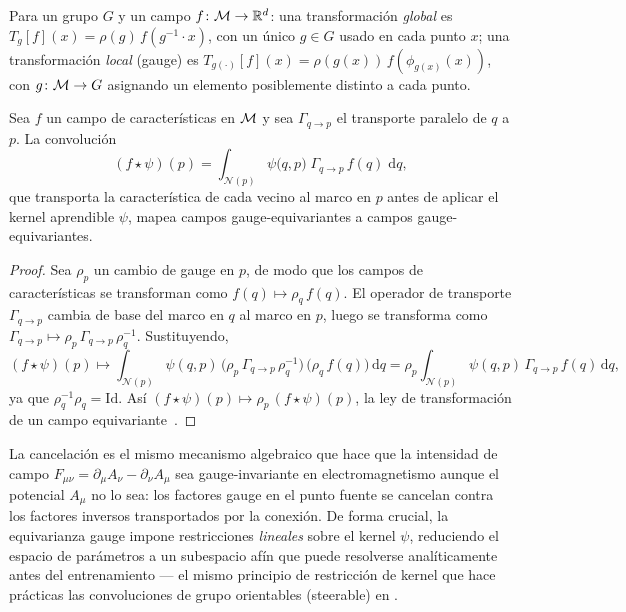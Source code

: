 \begin{definition}
\label{def:gauge:local-global}
Para un grupo $G$ y un campo $f\colon \mathcal{M} \to \mathbb{R}^d$:
una transformaci\'on \emph{global} es $T_g[f](x) = \rho(g)\, f(g^{-1} \cdot x)$,
con un \'unico $g \in G$ usado en cada punto $x$; una transformaci\'on
\emph{local} (gauge) es $T_{g(\cdot)}[f](x) = \rho(g(x))\, f(\phi_{g(x)}(x))$, con
$g\colon \mathcal{M} \to G$ asignando un elemento posiblemente distinto a cada punto.
\end{definition}

\begin{theorem}
\label{thm:gauge:conv}
Sea $f$ un campo de caracter\'isticas en $\mathcal{M}$ y sea $\Gamma_{q \to p}$ el
transporte paralelo de $q$ a $p$. La convoluci\'on
\[
  (f \star \psi)(p) = \int_{\mathcal{N}(p)}
    \psi\big(q, p\big)\; \Gamma_{q \to p}\, f(q)\; \mathrm{d}q,
\]
que transporta la caracter\'istica de cada vecino al marco en $p$ antes de
aplicar el kernel aprendible $\psi$, mapea campos gauge-equivariantes a campos
gauge-equivariantes.
\end{theorem}

\begin{proof}
Sea $\rho_p$ un cambio de gauge en $p$, de modo que los campos de
caracter\'isticas se transforman como $f(q) \mapsto \rho_q\, f(q)$. El operador de
transporte $\Gamma_{q \to p}$ cambia de base del marco en $q$ al marco en $p$,
luego se transforma como $\Gamma_{q \to p} \mapsto \rho_p\, \Gamma_{q \to p}\,
\rho_q^{-1}$. Sustituyendo,
\[
  (f \star \psi)(p) \mapsto \int_{\mathcal{N}(p)} \psi(q,p)\,
    \big(\rho_p\, \Gamma_{q\to p}\, \rho_q^{-1}\big)\,\big(\rho_q\, f(q)\big)\,
    \mathrm{d}q
  = \rho_p \int_{\mathcal{N}(p)} \psi(q,p)\, \Gamma_{q\to p}\, f(q)\, \mathrm{d}q,
\]
ya que $\rho_q^{-1}\rho_q = \mathrm{Id}$. As\'i $(f \star \psi)(p) \mapsto \rho_p\,
(f \star \psi)(p)$, la ley de transformaci\'on de un campo
equivariante~\citep{cohen2019gaugeequivariantconvolutional}.
\end{proof}

La cancelaci\'on es el mismo mecanismo algebraico que hace que la intensidad de
campo $F_{\mu\nu} = \partial_\mu A_\nu - \partial_\nu A_\mu$ sea gauge-invariante
en electromagnetismo aunque el potencial $A_\mu$ no lo sea: los factores gauge en
el punto fuente se cancelan contra los factores inversos transportados por la
conexi\'on. De forma crucial, la equivarianza gauge impone restricciones
\emph{lineales} sobre el kernel $\psi$, reduciendo el espacio de par\'ametros a
un subespacio af\'in que puede resolverse anal\'iticamente antes del
entrenamiento --- el mismo principio de restricci\'on de kernel que hace
pr\'acticas las convoluciones de grupo orientables (steerable) en
.

